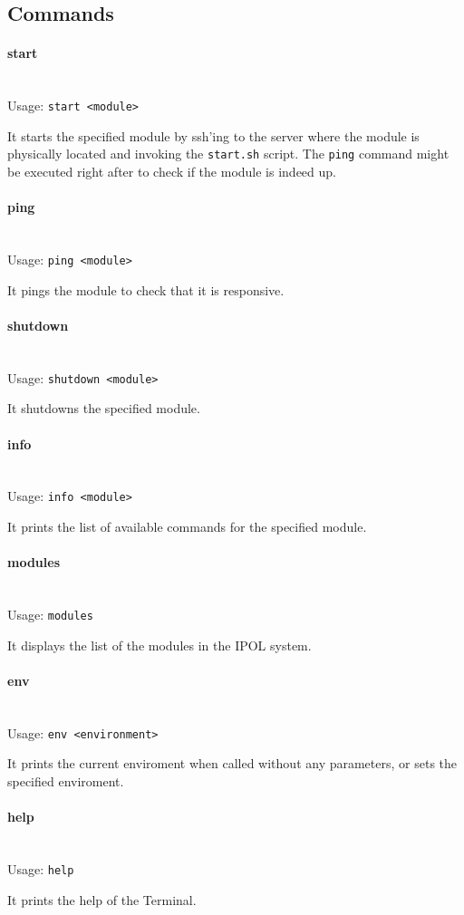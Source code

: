 \subsection{Commands}
\paragraph{start} \hspace{0pt} \\
Usage: {\tt start <module>}

It starts the specified module by ssh'ing to the server where the module is physically located and invoking the {\tt start.sh} script.
The {\tt ping} command might be executed right after to check if the module is indeed up.

\paragraph{ping} \hspace{0pt} \\
Usage: {\tt ping <module>}

It pings the module to check that it is responsive.

\paragraph{shutdown} \hspace{0pt} \\
Usage: {\tt shutdown <module>}

It shutdowns the specified module.

\paragraph{info} \hspace{0pt} \\
Usage: {\tt info <module>}

It prints the list of available commands for the specified module.

\paragraph{modules} \hspace{0pt} \\
Usage: {\tt modules}

It displays the list of the modules in the IPOL system.

\paragraph{env} \hspace{0pt} \\
Usage: {\tt env <environment>}

It prints the current enviroment when called without any parameters, or sets the specified enviroment.

\paragraph{help} \hspace{0pt} \\
Usage: {\tt help}

It prints the help of the Terminal.
